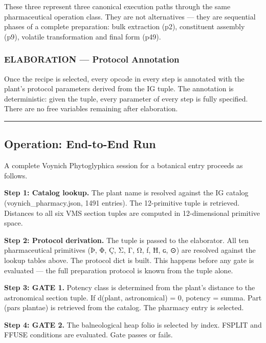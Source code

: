 \documentclass[12pt,a4paper]{article}
\begin{document}
These three represent three canonical execution paths through the same
pharmaceutical operation class. They are not alternatives --- they are
sequential phases of a complete preparation: bulk extraction (p2),
constituent assembly (p9), volatile transformation and final form (p49).

\hypertarget{elaboration-protocol-annotation}{%
\subsubsection{ELABORATION --- Protocol
Annotation}\label{elaboration-protocol-annotation}}

Once the recipe is selected, every opcode in every step is annotated
with the plant's protocol parameters derived from the IG tuple. The
annotation is deterministic: given the tuple, every parameter of every
step is fully specified. There are no free variables remaining after
elaboration.

\begin{center}\rule{0.5\linewidth}{0.5pt}\end{center}

\hypertarget{operation-end-to-end-run}{%
\subsection{Operation: End-to-End Run}\label{operation-end-to-end-run}}

A complete Voynich Phytoglyphica session for a botanical entry proceeds
as follows.

\textbf{Step 1: Catalog lookup.} The plant name is resolved against the
IG catalog (voynich\_pharmacy.json, 1491 entries). The 12-primitive
tuple is retrieved. Distances to all six VMS section tuples are computed
in 12-dimensional primitive space.

\textbf{Step 2: Protocol derivation.} The tuple is passed to the
elaborator. All ten pharmaceutical primitives (Þ, Φ, Ç, Σ, Γ, Ω, ƒ, Ħ,
ɢ, ⊙) are resolved against the lookup tables above. The protocol dict is
built. This happens before any gate is evaluated --- the full
preparation protocol is known from the tuple alone.

\textbf{Step 3: GATE 1.} Potency class is determined from the plant's
distance to the astronomical section tuple. If d(plant, astronomical) =
0, potency = summa. Part (pars plantae) is retrieved from the catalog.
The pharmacy entry is selected.

\textbf{Step 4: GATE 2.} The balneological heap folio is selected by
index. FSPLIT and FFUSE conditions are evaluated. Gate passes or fails.
\end{document}
